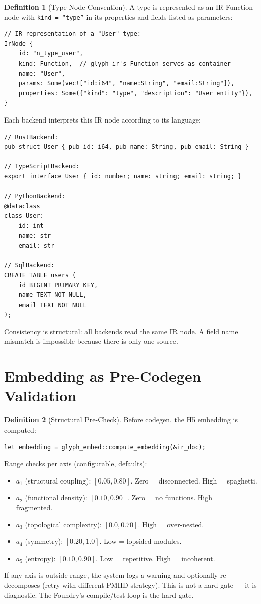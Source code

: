 \documentclass[11pt,a4paper,twoside]{article}
\theoremstyle{definition}
\newtheorem{definition}{Definition}[section]
\theoremstyle{plain}
\theoremstyle{remark}
\begin{document}
\begin{definition}[Type Node Convention]\label{def:typenode}
A type is represented as an IR Function node with
\texttt{kind = ``type''} in its properties and fields listed as
parameters:
\begin{lstlisting}
// IR representation of a "User" type:
IrNode {
    id: "n_type_user",
    kind: Function,  // glyph-ir's Function serves as container
    name: "User",
    params: Some(vec!["id:i64", "name:String", "email:String"]),
    properties: Some({"kind": "type", "description": "User entity"}),
}
\end{lstlisting}

Each backend interprets this IR node according to its language:
\begin{lstlisting}
// RustBackend:
pub struct User { pub id: i64, pub name: String, pub email: String }

// TypeScriptBackend:
export interface User { id: number; name: string; email: string; }

// PythonBackend:
@dataclass
class User:
    id: int
    name: str
    email: str

// SqlBackend:
CREATE TABLE users (
    id BIGINT PRIMARY KEY,
    name TEXT NOT NULL,
    email TEXT NOT NULL
);
\end{lstlisting}

Consistency is structural: all backends read the same IR node. A
field name mismatch is impossible because there is only one source.
\end{definition}


\section{Embedding as Pre-Codegen Validation}\label{sec:h5}

\begin{definition}[Structural Pre-Check]\label{def:precheck}
Before codegen, the H5 embedding is computed:
\begin{lstlisting}
let embedding = glyph_embed::compute_embedding(&ir_doc);
\end{lstlisting}

Range checks per axis (configurable, defaults):
\begin{itemize}[nosep]
  \item $a_1$ (structural coupling): $[0.05, 0.80]$. Zero = disconnected. High = spaghetti.
  \item $a_2$ (functional density): $[0.10, 0.90]$. Zero = no functions. High = fragmented.
  \item $a_3$ (topological complexity): $[0.0, 0.70]$. High = over-nested.
  \item $a_4$ (symmetry): $[0.20, 1.0]$. Low = lopsided modules.
  \item $a_5$ (entropy): $[0.10, 0.90]$. Low = repetitive. High = incoherent.
\end{itemize}

If any axis is outside range, the system logs a warning and
optionally re-decomposes (retry with different PMHD strategy).
This is not a hard gate --- it is diagnostic. The Foundry's
compile/test loop is the hard gate.
\end{definition}
\end{document}
